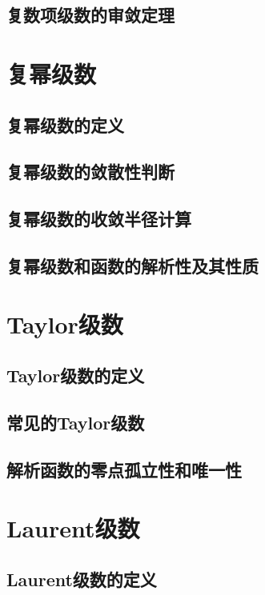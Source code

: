 \documentclass[12pt, a4paper]{ctexbook}
\begin{document}
            \subsection{复数项级数的审敛定理}

        \section{复幂级数}
            \subsection{复幂级数的定义}

            \subsection{复幂级数的敛散性判断}

            \subsection{复幂级数的收敛半径计算}

            \subsection{复幂级数和函数的解析性及其性质}

        \section{Taylor级数}
            \subsection{Taylor级数的定义}

            \subsection{常见的Taylor级数}

            \subsection{解析函数的零点孤立性和唯一性}

        \section{Laurent级数}
            \subsection{Laurent级数的定义}
\end{document}
